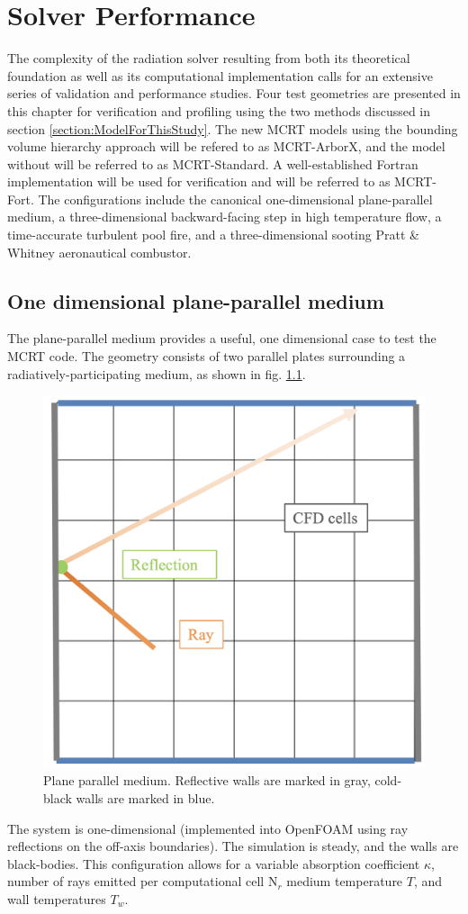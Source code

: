 \addchapheadtotoc
\chapter{Solver Performance}\label{chapter:Example}
The complexity of the radiation solver resulting from both its theoretical foundation as well as its computational implementation calls for an extensive series of validation and performance studies.
Four test geometries are presented in this chapter for verification and profiling using the two methods discussed in section \ref{section:ModelForThisStudy}. The new MCRT models using the bounding volume hierarchy approach will be refered to as MCRT-ArborX, and the model without will be referred to as MCRT-Standard. 
A well-established Fortran implementation will be used for verification and will be referred to as MCRT-Fort.
The configurations include the canonical one-dimensional plane-parallel medium, a three-dimensional backward-facing step in high temperature flow, a time-accurate turbulent pool fire, and a three-dimensional sooting Pratt \& Whitney aeronautical combustor. 



\section{One dimensional plane-parallel medium}
The plane-parallel medium provides a useful, one dimensional case to test the MCRT code. The geometry consists of two parallel plates surrounding a radiatively-participating medium, as shown in fig. \ref{fig:PlaneParallel}. 
\begin{figure}
\centering
\includegraphics[width=0.5\linewidth]{figures/ch4/PlaneParallel.png}
\caption{Plane parallel medium. Reflective walls are marked in gray, cold-black walls are marked in blue. }
\label{fig:PlaneParallel}
\end{figure}
The system is one-dimensional (implemented into OpenFOAM using ray reflections on the off-axis boundaries). The simulation is steady, and the walls are black-bodies.
This configuration allows for a variable absorption coefficient $\kappa{}$, number of rays emitted per computational cell N$_r$ medium temperature $T$, and wall temperatures $T_w$.

